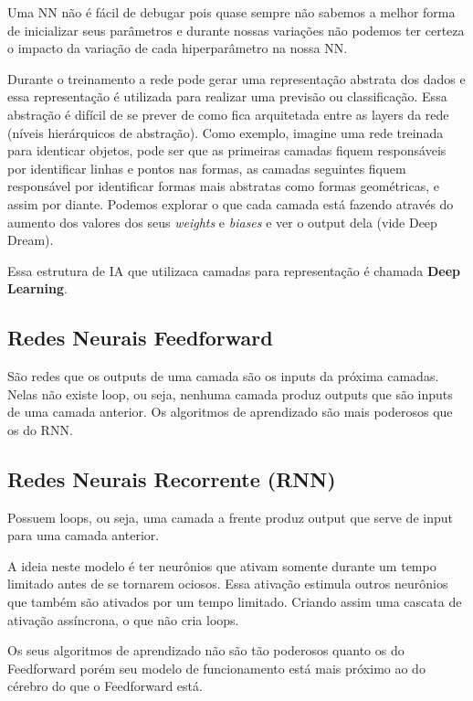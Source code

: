 \documentclass[11pt,a4paper,leqno]{article}
\begin{document}
Uma NN não é fácil de debugar pois quase sempre não sabemos a melhor forma de inicializar seus parâmetros e durante nossas variações não podemos ter certeza o impacto da variação de cada hiperparâmetro na nossa NN.


Durante o treinamento a rede pode gerar uma representação abstrata dos dados e essa representação é utilizada para realizar uma previsão ou classificação. Essa abstração é difícil de se prever de como fica arquitetada entre as layers da rede (níveis hierárquicos de abstração). Como exemplo, imagine uma rede treinada para identicar objetos, pode ser que as primeiras camadas fiquem responsáveis por identificar linhas e pontos nas formas, as camadas seguintes fiquem responsável por identificar formas mais abstratas como formas geométricas, e assim por diante. \linebreak
Podemos explorar o que cada camada está fazendo através do aumento dos valores dos seus \emph{weights} e \emph{biases} e ver o output dela (vide Deep Dream).

Essa estrutura de IA que utilizaca camadas para representação é chamada \textbf{Deep Learning}.



\subsection{Redes Neurais Feedforward}
São redes que os outputs de uma camada são os inputs da próxima camadas.
Nelas não existe loop, ou seja, nenhuma camada produz outputs que são inputs de uma camada anterior.
Os algoritmos de aprendizado são mais poderosos que os do RNN.




\subsection{Redes Neurais Recorrente (RNN)}
Possuem loops, ou seja, uma camada a frente produz output que serve de input para uma camada anterior.

A ideia neste modelo é ter neurônios que ativam somente durante um tempo limitado antes de se tornarem ociosos. Essa ativação estimula outros neurônios que também são ativados por um tempo limitado. Criando assim uma cascata de ativação assíncrona, o que não cria loops.

Os seus algoritmos de aprendizado não são tão poderosos quanto os do Feedforward porém seu modelo de funcionamento está mais próximo ao do cérebro do que o Feedforward está.
\end{document}
